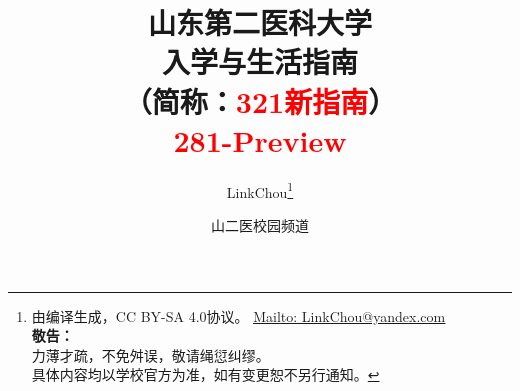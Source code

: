 

\title{%
\normalsize
{\Huge\textbf{山东第二医科大学\\[6pt]入学与生活指南}}\\[6pt]
（简称：\textcolor{red}{321新指南}）\\[25pt]
{\large\textcolor{red}{281-Preview}}\vspace*{-25pt}}
\author{LinkChou\thanks{由\LaTeXe 编译生成，CC BY-SA 4.0协议。%
                \uline{\href{Mailto:LinkChou@yandex.com}{Mailto: LinkChou@yandex.com}}\\%
                \textbf{敬告：}\\%
                \indent\indent 力薄才疏，不免舛误，敬请绳愆纠缪。\\%
                \indent\indent 具体内容均以学校官方为准，如有变更恕不另行通知。}\and 山二医校园频道}
\date{\DTMnow}
\maketitle

\renewcommand{\thefootnote}{\arabic{footnote}}

\tableofcontents
